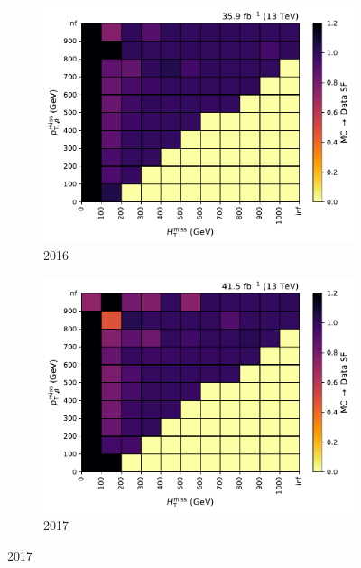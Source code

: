 \begin{figure}[htbp]
    \centering
    \begin{subfigure}[b]{0.49\textwidth}
        \includegraphics[width=\textwidth]{figures/trigger_efficiencies/2016/SFs.pdf}
        \caption{2016}
    \end{subfigure}
    \hfill
    \begin{subfigure}[b]{0.49\textwidth}
        \includegraphics[width=\textwidth]{figures/trigger_efficiencies/2017/SFs.pdf}
        \caption{2017}
    \end{subfigure}


\end{figure}
